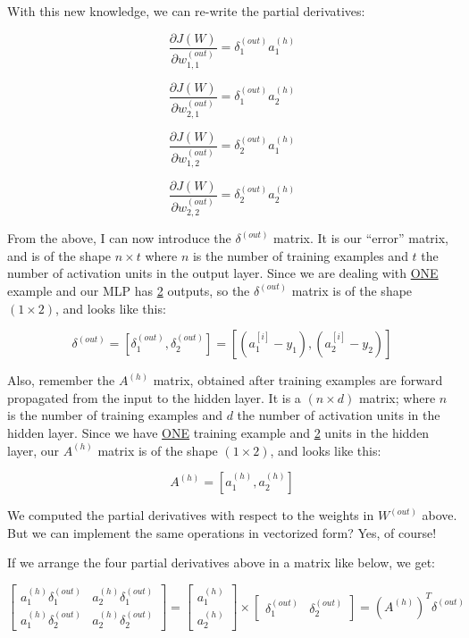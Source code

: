 \documentclass[12pt, letterpaper]{article}
\begin{document}
\vspace{5mm} %

With this new knowledge, we can re-write the partial derivatives:

\[
    \frac{\partial J(W)}{\partial w_{1,1}^{(out)}} =
    \delta_1^{(out)} a_1^{(h)}
\]

\[
    \frac{\partial J(W)}{\partial w_{2,1}^{(out)}} =
    \delta_1^{(out)} a_2^{(h)}
\]

\[
    \frac{\partial J(W)}{\partial w_{1,2}^{(out)}} =
    \delta_2^{(out)} a_1^{(h)}
\]

\[
    \frac{\partial J(W)}{\partial w_{2,2}^{(out)}} =
    \delta_2^{(out)} a_2^{(h)}
\]

From the above, I can now introduce the $\delta^{(out)}$ matrix.
It is our ``error'' matrix, and is of the shape $n \times t$ 
where $n$ is the number of training examples and $t$ the number 
of activation units in the output layer. Since we are dealing with
\underline{ONE} example and our MLP has \underline{2} outputs, so 
the $\delta^{(out)}$ matrix is of the shape $(1 \times 2)$, and 
looks like this:

\[
    \delta^{(out)} = [\delta_1^{(out)}, \delta_2^{(out)}] =
    [(a_{1}^{[i]} - y_1), (a_{2}^{[i]} - y_2)]
\]

\vspace{5mm} %

Also, remember the $A^{(h)}$ matrix, obtained after training
examples are forward propagated from the input to the hidden layer.
It is a $(n \times d)$ matrix; where $n$ is the number of training
examples and $d$ the number of activation units in the hidden layer.
Since we have \underline{ONE} training example and \underline{2}
units in the hidden layer, our $A^{(h)}$ matrix is of the shape
$(1 \times 2)$, and looks like this:

\[
    A^{(h)} = [a_1^{(h)}, a_2^{(h)}]
\]

We computed the partial derivatives with respect to the weights in
$W^{(out)}$ above. But we can implement the same operations in 
vectorized form? Yes, of course!

\vspace{5mm} %

If we arrange the four partial derivatives above in a matrix like
below, we get:

\[
    \begin{bmatrix}
        a_1^{(h)} \delta_1^{(out)} & a_2^{(h)} \delta_1^{(out)} \\
        a_1^{(h)} \delta_2^{(out)} & a_2^{(h)} \delta_2^{(out)}
    \end{bmatrix}
    =
    \begin{bmatrix}
        a_1^{(h)} \\
        a_2^{(h)}
    \end{bmatrix}
    \times
    \begin{bmatrix}
        \delta_1^{(out)} & \delta_2^{(out)}
    \end{bmatrix}
    = 
    (A^{(h)})^{T} \delta^{(out)}
\]
\end{document}

